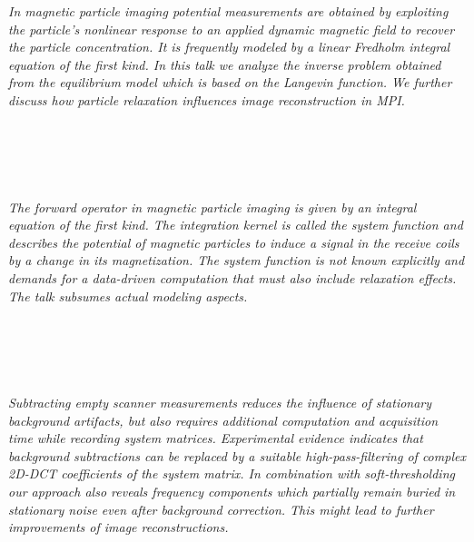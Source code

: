   \begin{multicols}{2}
      \textit{In magnetic particle imaging potential measurements are obtained by exploiting the particle’s nonlinear response to an applied dynamic magnetic field to recover the particle concentration. It is frequently modeled by a linear Fredholm integral equation of the first kind. In this talk we analyze the inverse problem obtained from the equilibrium model which is based on the Langevin function. We further discuss how particle relaxation influences image reconstruction in MPI.}\\
\\ 
        \\
        \\\\
\\
      \textit{The forward operator in magnetic particle imaging is given by an integral equation of the first kind. The integration kernel is called the system function and describes the potential of magnetic particles to induce a signal in the receive coils by a change in its magnetization. The system function is not known explicitly and demands for a data-driven computation that must also include relaxation effects. The talk subsumes actual modeling aspects.}\\
\\ 
        \\
        \\\\
\\
      \textit{Subtracting empty scanner measurements reduces the influence of stationary background artifacts, but also requires additional computation and acquisition time while recording system matrices. 
Experimental evidence indicates that background subtractions can be replaced by a suitable high-pass-filtering of complex 2D-DCT coefficients of the system matrix. 
In combination with soft-thresholding our approach also reveals frequency components which partially remain buried in stationary noise even after background correction.  
This might lead to further improvements of image reconstructions.}\\
\\ 
        \\
        \\\\
\\

\end{multicols}
